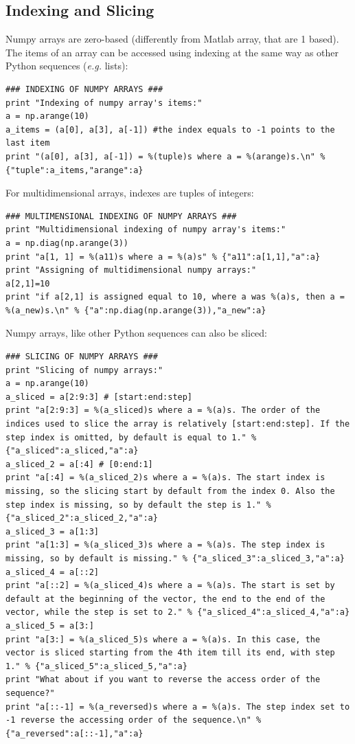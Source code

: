 \documentclass[aps,letterpaper,10pt]{revtex4}
\begin{document}
\subsection{Indexing and Slicing}
Numpy arrays are zero-based (differently from Matlab array, that are 1 based). The items of an array can be accessed using indexing at the same way as other Python sequences (\textit{e.g.} lists):
\begin{lstlisting}
### INDEXING OF NUMPY ARRAYS ###
print "Indexing of numpy array's items:"
a = np.arange(10)
a_items = (a[0], a[3], a[-1]) #the index equals to -1 points to the last item
print "(a[0], a[3], a[-1]) = %(tuple)s where a = %(arange)s.\n" % {"tuple":a_items,"arange":a}
\end{lstlisting}
For multidimensional arrays, indexes are tuples of integers:
\begin{lstlisting}
### MULTIMENSIONAL INDEXING OF NUMPY ARRAYS ###
print "Multidimensional indexing of numpy array's items:"
a = np.diag(np.arange(3))
print "a[1, 1] = %(a11)s where a = %(a)s" % {"a11":a[1,1],"a":a}
print "Assigning of multidimensional numpy arrays:"
a[2,1]=10
print "if a[2,1] is assigned equal to 10, where a was %(a)s, then a = %(a_new)s.\n" % {"a":np.diag(np.arange(3)),"a_new":a}
\end{lstlisting}
Numpy arrays, like other Python sequences can also be sliced:
\begin{lstlisting}
### SLICING OF NUMPY ARRAYS ###
print "Slicing of numpy arrays:"
a = np.arange(10)
a_sliced = a[2:9:3] # [start:end:step]
print "a[2:9:3] = %(a_sliced)s where a = %(a)s. The order of the indices used to slice the array is relatively [start:end:step]. If the step index is omitted, by default is equal to 1." % {"a_sliced":a_sliced,"a":a}
a_sliced_2 = a[:4] # [0:end:1]
print "a[:4] = %(a_sliced_2)s where a = %(a)s. The start index is missing, so the slicing start by default from the index 0. Also the step index is missing, so by default the step is 1." % {"a_sliced_2":a_sliced_2,"a":a}
a_sliced_3 = a[1:3]
print "a[1:3] = %(a_sliced_3)s where a = %(a)s. The step index is missing, so by default is missing." % {"a_sliced_3":a_sliced_3,"a":a}
a_sliced_4 = a[::2]
print "a[::2] = %(a_sliced_4)s where a = %(a)s. The start is set by default at the beginning of the vector, the end to the end of the vector, while the step is set to 2." % {"a_sliced_4":a_sliced_4,"a":a}
a_sliced_5 = a[3:]
print "a[3:] = %(a_sliced_5)s where a = %(a)s. In this case, the vector is sliced starting from the 4th item till its end, with step 1." % {"a_sliced_5":a_sliced_5,"a":a}
print "What about if you want to reverse the access order of the sequence?"
print "a[::-1] = %(a_reversed)s where a = %(a)s. The step index set to -1 reverse the accessing order of the sequence.\n" % {"a_reversed":a[::-1],"a":a} 
\end{lstlisting}
\end{document}
